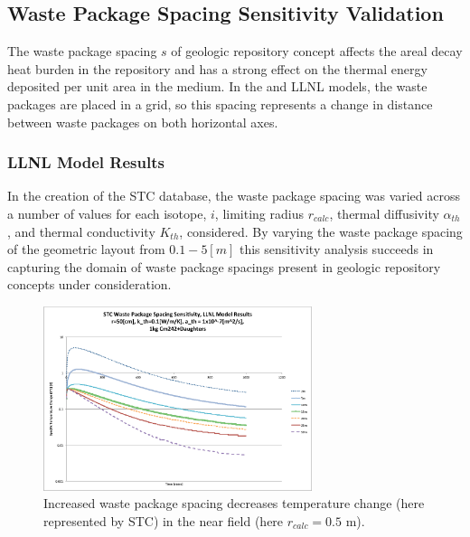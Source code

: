 \subsection{Waste Package Spacing Sensitivity Validation}\label{sec:spacing}
The waste package spacing $s$ of geologic repository concept affects the areal 
decay heat burden in the repository and has a strong effect on the thermal 
energy deposited per unit area in the medium. In the \Cyder and \gls{LLNL} 
models, the waste packages are placed in a grid, so this spacing represents a 
change in distance between waste packages on both horizontal axes.

\FloatBarrier
\subsubsection{LLNL Model Results}

In the creation of the \gls{STC} database, the waste package spacing was varied 
across a number of values for each isotope, $i$, limiting 
radius $r_{calc}$, thermal diffusivity $\alpha_{th}$, and thermal conductivity $K_{th}$, considered.  By 
varying the waste package spacing of the geometric layout from $0.1-5 [m]$
this sensitivity analysis succeeds in capturing the domain of 
waste package spacings present in geologic repository concepts under 
consideration. 

\begin{figure}[htbp!]
\begin{center}
\includegraphics[width=0.7\textwidth]{./chapters/demonstration/spacing/Cm242spacing_sens.eps}
\end{center}
\caption[Thermal Sensitivity to $K_{th}$ and $s$]{Increased waste package 
spacing decreases temperature change 
(here represented by \gls{STC}) in the near field (here $r_{calc} = 0.5$ m).}
\label{fig:Cm242spacing_sens}
\end{figure}

